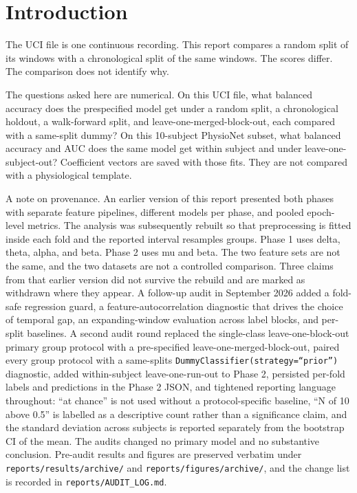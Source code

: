 \documentclass[11pt]{article}
\begin{document}
\section{Introduction}
The UCI file is one continuous recording. This report compares a random split of its windows with a chronological split of the same windows. The scores differ. The comparison does not identify why.

The questions asked here are numerical. On this UCI file, what balanced accuracy does the prespecified model get under a random split, a chronological holdout, a walk-forward split, and leave-one-merged-block-out, each compared with a same-split dummy? On this 10-subject PhysioNet subset, what balanced accuracy and AUC does the same model get within subject and under leave-one-subject-out? Coefficient vectors are saved with those fits. They are not compared with a physiological template.

A note on provenance. An earlier version of this report presented both phases with separate feature pipelines, different models per phase, and pooled epoch-level metrics. The analysis was subsequently rebuilt so that preprocessing is fitted inside each fold and the reported interval resamples groups. Phase 1 uses delta, theta, alpha, and beta. Phase 2 uses mu and beta. The two feature sets are not the same, and the two datasets are not a controlled comparison. Three claims from that earlier version did not survive the rebuild and are marked as withdrawn where they appear. A follow-up audit in September 2026 added a fold-safe regression guard, a feature-autocorrelation diagnostic that drives the choice of temporal gap, an expanding-window evaluation across label blocks, and per-split baselines. A second audit round replaced the single-class leave-one-block-out primary group protocol with a pre-specified leave-one-merged-block-out, paired every group protocol with a same-splits \texttt{DummyClassifier(strategy=``prior'')} diagnostic, added within-subject leave-one-run-out to Phase 2, persisted per-fold labels and predictions in the Phase 2 JSON, and tightened reporting language throughout: ``at chance'' is not used without a protocol-specific baseline, ``N of 10 above 0.5'' is labelled as a descriptive count rather than a significance claim, and the standard deviation across subjects is reported separately from the bootstrap CI of the mean. The audits changed no primary model and no substantive conclusion. Pre-audit results and figures are preserved verbatim under \texttt{reports/results/archive/} and \texttt{reports/figures/archive/}, and the change list is recorded in \texttt{reports/AUDIT\_LOG.md}.
\end{document}
